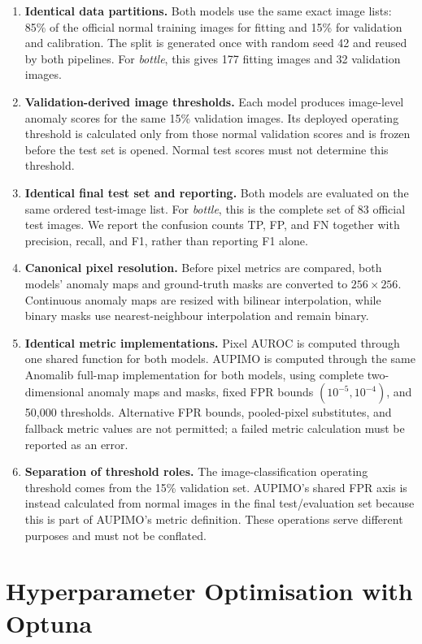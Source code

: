 \documentclass[11pt, a4paper]{article}
\begin{document}
\begin{enumerate}
    \item \textbf{Identical data partitions.} Both models use the same exact image lists: 85\% of the official normal training images for fitting and 15\% for validation and calibration. The split is generated once with random seed 42 and reused by both pipelines. For \textit{bottle}, this gives 177 fitting images and 32 validation images.
    \item \textbf{Validation-derived image thresholds.} Each model produces image-level anomaly scores for the same 15\% validation images. Its deployed operating threshold is calculated only from those normal validation scores and is frozen before the test set is opened. Normal test scores must not determine this threshold.
    \item \textbf{Identical final test set and reporting.} Both models are evaluated on the same ordered test-image list. For \textit{bottle}, this is the complete set of 83 official test images. We report the confusion counts TP, FP, and FN together with precision, recall, and F1, rather than reporting F1 alone.
    \item \textbf{Canonical pixel resolution.} Before pixel metrics are compared, both models' anomaly maps and ground-truth masks are converted to $256 \times 256$. Continuous anomaly maps are resized with bilinear interpolation, while binary masks use nearest-neighbour interpolation and remain binary.
    \item \textbf{Identical metric implementations.} Pixel AUROC is computed through one shared function for both models. AUPIMO is computed through the same Anomalib full-map implementation \cite{anomalib} for both models, using complete two-dimensional anomaly maps and masks, fixed FPR bounds $(10^{-5},10^{-4})$, and 50,000 thresholds. Alternative FPR bounds, pooled-pixel substitutes, and fallback metric values are not permitted; a failed metric calculation must be reported as an error.
    \item \textbf{Separation of threshold roles.} The image-classification operating threshold comes from the 15\% validation set. AUPIMO's shared FPR axis is instead calculated from normal images in the final test/evaluation set because this is part of AUPIMO's metric definition. These operations serve different purposes and must not be conflated.
\end{enumerate}

\section{Hyperparameter Optimisation with Optuna}
\label{sec:optuna}
\end{document}
